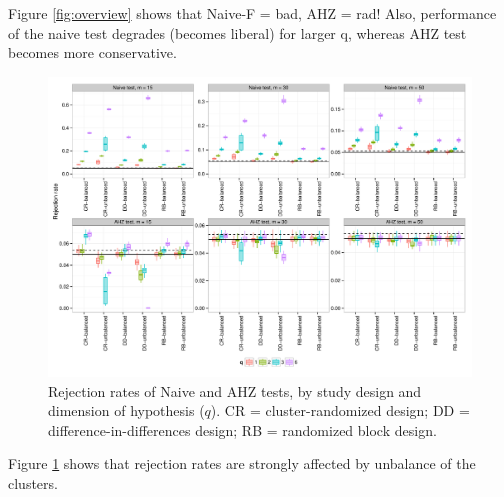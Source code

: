 \documentclass[12pt]{article}\usepackage[]{graphicx}\usepackage[]{color}
\newenvironment{knitrout}{}{} %
\begin{document}
Figure \ref{fig:overview} shows that Naive-F = bad, AHZ = rad! Also, performance of the naive test degrades (becomes liberal) for larger q, whereas AHZ test becomes more conservative.

\begin{knitrout}
\color{fgcolor}\begin{figure}

{\centering \includegraphics[width=\linewidth]{CR_fig/balance-1} 

}

\caption[Rejection rates of Naive and AHZ tests, by study design and dimension of hypothesis (]{Rejection rates of Naive and AHZ tests, by study design and dimension of hypothesis ($q$). CR = cluster-randomized design; DD = difference-in-differences design; RB = randomized block design.}\label{fig:balance}
\end{figure}


\end{knitrout}

Figure \ref{fig:balance} shows that rejection rates are strongly affected by unbalance of the clusters.
\end{document}
